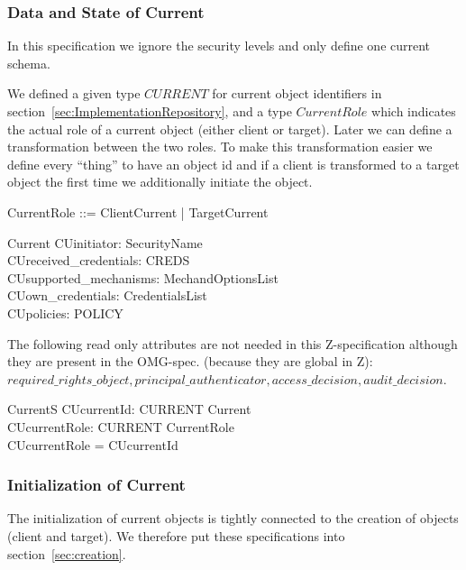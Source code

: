 \subsubsection{Data and State of Current}

In this specification we ignore the security levels and only define one current
schema.

We defined a given type $CURRENT$ for current object identifiers in
section~\ref{sec:ImplementationRepository}, and a type $CurrentRole$ which
indicates the actual role of a current object (either client or target).  Later
we can define a transformation between the two roles.  To make this
transformation easier we define every ``thing'' to have an object id and if a
client is transformed to a target object the first time we additionally initiate
the object.
\begin{zed}
  CurrentRole ::= ClientCurrent | TargetCurrent \\
\end{zed}
\begin{schema}{Current}
  CUinitiator: SecurityName \\
  CUreceived\_credentials: CREDS \\
  CUsupported\_mechanisms: MechandOptionsList \\
  CUown\_credentials: CredentialsList \\
  CUpolicies: \power POLICY \\
\end{schema}
The following read only attributes are not needed in this Z-specification
although they are present in the OMG-spec. (because they are global in Z):
$required\_rights\_object, principal\_authenticator, access\_decision,
audit\_decision$. 

\begin{schema}{CurrentS}
  CUcurrentId: CURRENT \pfun Current \\
  CUcurrentRole: CURRENT \pfun CurrentRole \\
  \where
  \dom CUcurrentRole = \dom CUcurrentId \\
\end{schema}

\subsubsection{Initialization of Current}
The initialization of current objects is tightly connected to the creation of
objects (client and target).  We therefore put these specifications into
section~\ref{sec:creation}.


